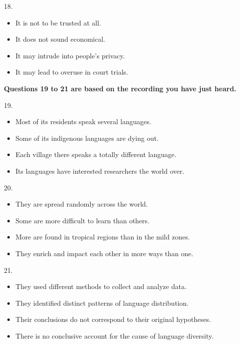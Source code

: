 \documentclass[UTF8,11pt]{ctexart}
\begin{document}
18.


\begin{itemize}[leftmargin=2em,itemsep=.2em,topsep=.4em]\item[A.] It is not to be trusted at all.
\item[B.] It does not sound economical.
\item[C.] It may intrude into people’s privacy.
\item[D.] It may lead to overuse in court trials.
\end{itemize}

\textbf{Questions 19 to 21 are based on the recording you have just heard.}


19.


\begin{itemize}[leftmargin=2em,itemsep=.2em,topsep=.4em]\item[A.] Most of its residents speak several languages.
\item[B.] Some of its indigenous languages are dying out.
\item[C.] Each village there speaks a totally different language.
\item[D.] Its languages have interested researchers the world over.
\end{itemize}

20.


\begin{itemize}[leftmargin=2em,itemsep=.2em,topsep=.4em]\item[A.] They are spread randomly across the world.
\item[B.] Some are more difficult to learn than others.
\item[C.] More are found in tropical regions than in the mild zones.
\item[D.] They enrich and impact each other in more ways than one.
\end{itemize}

21.


\begin{itemize}[leftmargin=2em,itemsep=.2em,topsep=.4em]\item[A.] They used different methods to collect and analyze data.
\item[B.] They identified distinct patterns of language distribution.
\item[C.] Their conclusions do not correspond to their original hypotheses.
\item[D.] There is no conclusive account for the cause of language diversity.
\end{itemize}
\end{document}
